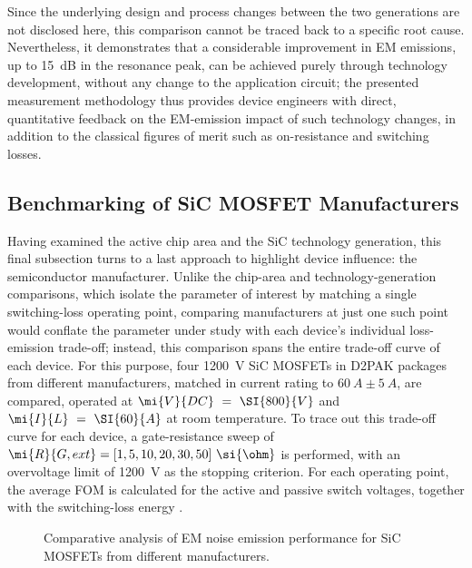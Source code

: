 Since the underlying design and process changes between the two generations are not disclosed here, this comparison cannot be traced back to a specific root cause.
Nevertheless, it demonstrates that a considerable improvement in EM emissions, up to \SI{15}{dB} in the resonance peak, can be achieved purely through technology development, without any change to the application circuit; the presented measurement methodology thus provides device engineers with direct, quantitative feedback on the EM-emission impact of such technology changes, in addition to the classical figures of merit such as on-resistance and switching losses.

\FloatBarrier


\subsection{Benchmarking of SiC MOSFET Manufacturers}
\label{sec:benchmark}
Having examined the active chip area and the SiC technology generation, this final subsection turns to a last approach to highlight device influence: the semiconductor manufacturer.
Unlike the chip-area and technology-generation comparisons, which isolate the parameter of interest by matching a single switching-loss operating point, comparing manufacturers at just one such point would conflate the parameter under study with each device's individual loss-emission trade-off; instead, this comparison spans the entire trade-off curve of each device.
For this purpose, four \SI{1200}{V} SiC MOSFETs in D2PAK packages from different manufacturers, matched in current rating to $\SI{60}{A}\pm\SI{5}{A}$, are compared, operated at $\mi{V}{DC}~=~\SI{800}{V}$ and $\mi{I}{L}~=~\SI{60}{A}$ at room temperature.
To trace out this trade-off curve for each device, a gate-resistance sweep of $\mi{R}{G,ext} = [1, 5, 10, 20, 30, 50]~\si{\ohm}$ is performed, with an overvoltage limit of \SI{1200}{V} as the stopping criterion.
For each operating point, the average FOM is calculated for the active and passive switch voltages, together with the switching-loss energy .

\begin{figure}[h]
	\centering
	
	\caption{Comparative analysis of EM noise emission performance for SiC MOSFETs from different manufacturers.}
	\label{fig:MR_CompetitorAnalysis}
\end{figure}

